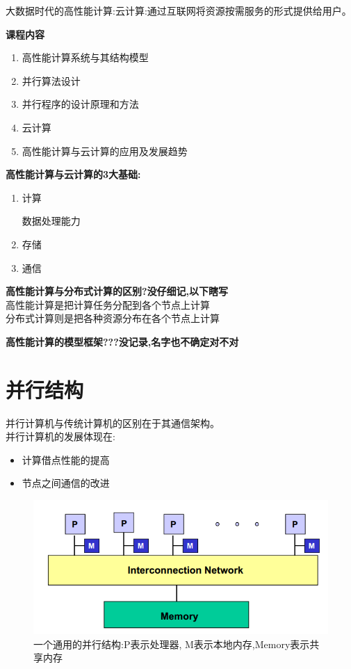 \documentclass[UTF8,a4paper]{ctexart}
\newcommand{\spaceline}{\vspace{\baselineskip}}
\begin{document}
  大数据时代的高性能计算:云计算:通过互联网将资源按需服务的形式提供给用户。

  \spaceline
  \textbf{课程内容}
  \begin{enumerate}
    \item 高性能计算系统与其结构模型
    \item 并行算法设计
    \item 并行程序的设计原理和方法
    \item 云计算
    \item 高性能计算与云计算的应用及发展趋势
  \end{enumerate}

  \spaceline
  \textbf{高性能计算与云计算的3大基础:}
  \begin{enumerate}
    \item 计算

    数据处理能力

    \item 存储

    \item 通信
  \end{enumerate}

  \spaceline
  \textbf{高性能计算与分布式计算的区别?没仔细记,以下瞎写}\\
  高性能计算是把计算任务分配到各个节点上计算\\
  分布式计算则是把各种资源分布在各个节点上计算

  \spaceline
  \textbf{高性能计算的模型框架???没记录,名字也不确定对不对}

  \section{并行结构}
  并行计算机与传统计算机的区别在于其通信架构。\\
  并行计算机的发展体现在:
  \begin{itemize}
    \item 计算借点性能的提高
    \item 节点之间通信的改进
  \end{itemize}

  \begin{figure}[H]
    \centering
    \includegraphics[scale = 0.3]{assets/ParallelComputing_0293e.png}
    \caption{一个通用的并行结构:P表示处理器, M表示本地内存,Memory表示共享内存}
  \end{figure}
\end{document}
